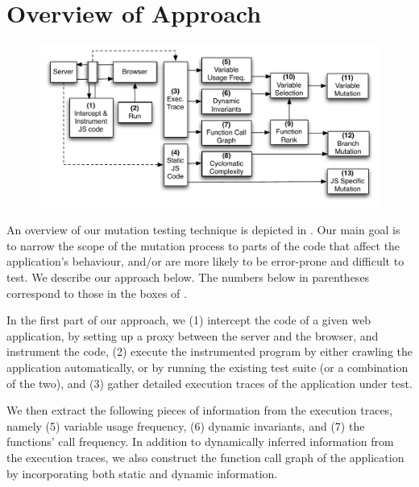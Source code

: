 \section{Overview of Approach} \label{Sec:approach}

\begin{figure}
\centering
\includegraphics[width=1\hsize]{fig/approach-view}
\vspace{-0.1in} 
\label{Fig:mutation}
\end{figure}


An  overview of our mutation testing technique is depicted in . Our main goal is to narrow the scope of the mutation process to parts of the code that affect the application's behaviour, and/or are more likely  to be error-prone and difficult to test. We describe our approach below.  The numbers below in parentheses correspond to those in the boxes of .

In the first part of our approach, we
(1) intercept the \javascript code of a given web application, by setting up a  proxy between the server and the browser, and instrument the code, 
(2) execute the 
instrumented program by either crawling the application automatically, or by running the existing test suite (or a combination of the two), and (3) gather detailed execution traces of the application under test. 

We then extract the following pieces of information from the 
execution traces, namely (5) variable usage frequency, 
(6) dynamic invariants, and (7) the functions' call frequency.
In addition to dynamically inferred information from the execution traces, 
we also construct the function call graph of the application by incorporating both static and dynamic information.

